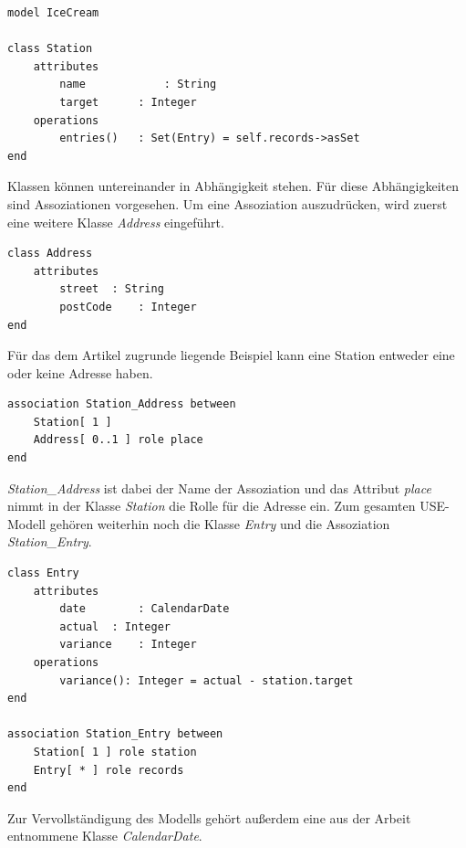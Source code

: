 \documentclass[a4paper,twoside]{article}
\begin{document}
\lstset{basicstyle=\tiny,style=myCustomUseStyle}
\begin{lstlisting}
model IceCream

class Station
	attributes
		name			: String
		target		: Integer
	operations
		entries()	: Set(Entry) = self.records->asSet
end
\end{lstlisting}

Klassen können untereinander in Abhängigkeit stehen. Für diese Abhängigkeiten sind Assoziationen vorgesehen. Um eine Assoziation auszudrücken, wird zuerst eine weitere Klasse \textit{Address} eingeführt.

\begin{lstlisting}
class Address
	attributes
		street	: String
		postCode	: Integer
end
\end{lstlisting}

Für das dem Artikel zugrunde liegende Beispiel kann eine Station entweder eine oder keine Adresse haben.

\begin{lstlisting}
association Station_Address between
	Station[ 1 ] 
	Address[ 0..1 ] role place
end
\end{lstlisting}

\textit{Station\_Address} ist dabei der Name der Assoziation und das Attribut \textit{place} nimmt in der Klasse \textit{Station} die Rolle für die Adresse ein. Zum gesamten USE-Modell gehören weiterhin noch die Klasse \textit{Entry} und die Assoziation \textit{Station\_Entry}.

\begin{lstlisting}
class Entry
	attributes
		date		: CalendarDate
		actual	: Integer
		variance	: Integer
	operations
		variance(): Integer = actual - station.target	
end

association Station_Entry between
	Station[ 1 ] role station
	Entry[ * ] role records
end
\end{lstlisting}

Zur Vervollständigung des Modells gehört außerdem eine aus der Arbeit \cite{SilvaMasterThesis} entnommene Klasse \textit{CalendarDate}.
\end{document}
